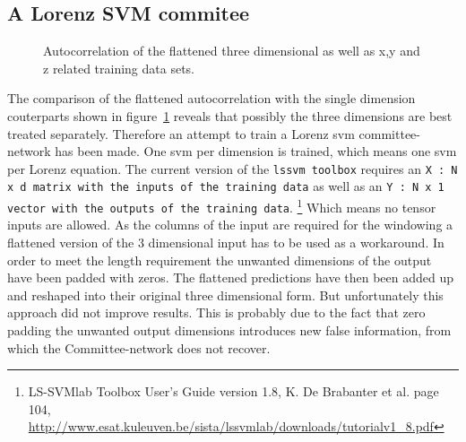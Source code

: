 \subsection{A Lorenz SVM commitee}
\begin{figure}
\centering




\caption{Autocorrelation of the flattened three dimensional as well as x,y and z related training data sets.}
\label{fig:lorAutocorr}
\end{figure}
The comparison of the flattened autocorrelation with the single dimension couterparts shown in figure~\ref{fig:lorAutocorr} reveals that possibly the three dimensions are best treated separately.
Therefore an attempt to train a Lorenz svm committee-network has been made. One svm per dimension is trained, which means one svm per Lorenz equation. The current version of the \texttt{lssvm toolbox} requires an \texttt{X : N x d matrix with the inputs of the training data} as well as an \texttt{Y : N x 1 vector with the outputs of the training data}. \footnote{LS-SVMlab Toolbox User’s Guide
version 1.8, K. De Brabanter et al. page 104, \url{http://www.esat.kuleuven.be/sista/lssvmlab/downloads/tutorialv1_8.pdf}} Which means no tensor inputs are allowed. As the columns of the input are required for the windowing a flattened version of the 3 dimensional input has to be used as a workaround. In order to meet the length requirement the unwanted dimensions of the output have been padded with zeros. The flattened predictions have then been added up and reshaped into their original three dimensional form. But unfortunately this approach did not improve results. This is probably due to the fact that zero padding the unwanted output dimensions introduces new false information, from which the Committee-network does not recover. 


